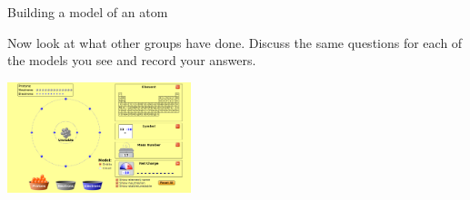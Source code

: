 \begin{groupdiscussion}{Building a model of an atom }
\begin{multicols}{2}
\begin{itemize}[noitemsep]
\end{itemize}
        \label{m38741*id260596}Now look at what other groups have done. Discuss the same questions for each of the models you see and record your answers. 
\end{multicols}
\begin{center}
 \includegraphics[width=0.4\textwidth]{photos/BuildAtom.png}
\end{center}

\end{groupdiscussion}   

